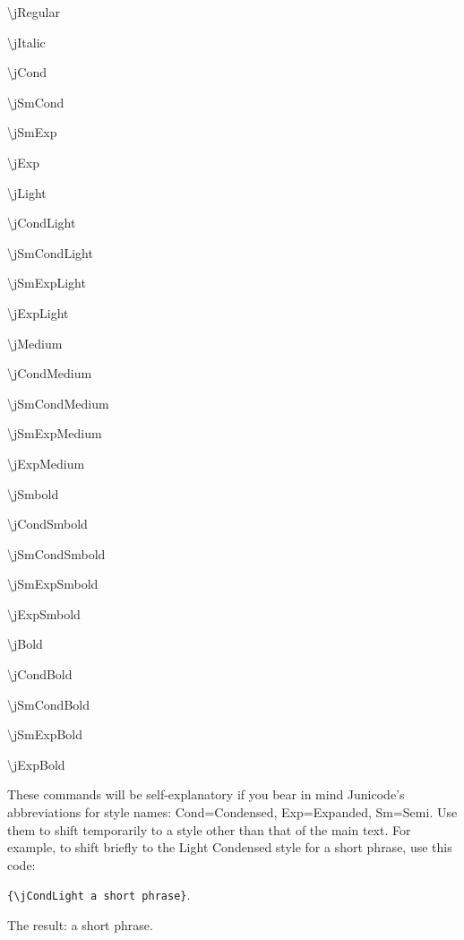 \documentclass[12pt]{article}
\begin{document}
\begin{multicols}{3}
    \jCond\textbackslash jRegular

    \textbackslash jItalic
    
    \textbackslash jCond
    
    \textbackslash jSmCond
    
    \textbackslash jSmExp
    
    \textbackslash jExp
    
    \textbackslash jLight
    
    \textbackslash jCondLight
    
    \textbackslash jSmCondLight
    
    \textbackslash jSmExpLight
    
    \textbackslash jExpLight
    
    \textbackslash jMedium
    
    \textbackslash jCondMedium
    
    \textbackslash jSmCondMedium
    
    \textbackslash jSmExpMedium
    
    \textbackslash jExpMedium
    
    \textbackslash jSmbold
    
    \textbackslash jCondSmbold
    
    \textbackslash jSmCondSmbold
    
    \textbackslash jSmExpSmbold
    
    \textbackslash jExpSmbold
    
    \textbackslash jBold
    
    \textbackslash jCondBold
    
    \textbackslash jSmCondBold
    
    \textbackslash jSmExpBold
    
    \textbackslash jExpBold
    
\end{multicols}

\noindent These commands will be self-explanatory if you bear in mind Junicode's 
abbreviations for style names: Cond=Condensed, Exp=Expanded, Sm=Semi. Use
them to shift temporarily to a style other than that of the main text.
For example, to shift briefly to the Light Condensed style for a short phrase, use
this code:
\begin{center}
{\small\verb|{\jCondLight a short phrase}|}.
\end{center}
The result: {\jCondLight a short phrase}.
\end{document}
